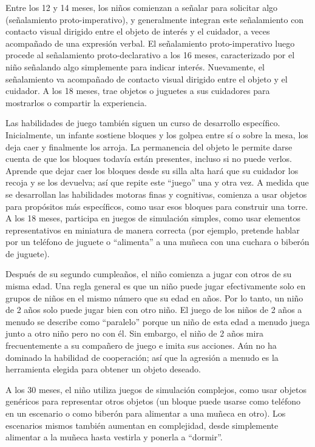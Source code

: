 \documentclass[11pt,letterpaper]{report}
\begin{document}
Entre los 12 y 14 meses, los niños comienzan a señalar para solicitar algo
(señalamiento proto-imperativo), y generalmente integran este señalamiento con
contacto visual dirigido entre el objeto de interés y el cuidador, a veces
acompañado de una expresión verbal. El señalamiento proto-imperativo luego
procede al señalamiento proto-declarativo a los 16 meses, caracterizado por el
niño señalando algo simplemente para indicar interés. Nuevamente, el
señalamiento va acompañado de contacto visual dirigido entre el objeto y el
cuidador. A los 18 meses, trae objetos o juguetes a sus cuidadores para
mostrarlos o compartir la experiencia. \cite{Gerber2011}

Las habilidades de juego también siguen un curso de desarrollo específico.
Inicialmente, un infante sostiene bloques y los golpea entre sí o sobre la
mesa, los deja caer y finalmente los arroja. La permanencia del objeto le
permite darse cuenta de que los bloques todavía están presentes, incluso si no
puede verlos. Aprende que dejar caer los bloques desde su silla alta hará que
su cuidador los recoja y se los devuelva; así que repite este ``juego'' una y
otra vez. A medida que se desarrollan las habilidades motoras finas y
cognitivas, comienza a usar objetos para propósitos más específicos, como usar
esos bloques para construir una torre. A los 18 meses, participa en juegos de
simulación simples, como usar elementos representativos en miniatura de manera
correcta (por ejemplo, pretende hablar por un teléfono de juguete o ``alimenta''
a una muñeca con una cuchara o biberón de juguete). \cite{Gerber2011}

Después de su segundo cumpleaños, el niño comienza a jugar con otros de su
misma edad. Una regla general es que un niño puede jugar efectivamente solo en
grupos de niños en el mismo número que su edad en años. Por lo tanto, un niño
de 2 años solo puede jugar bien con otro niño. El juego de los niños de 2 años
a menudo se describe como ``paralelo'' porque un niño de esta edad a menudo
juega junto a otro niño pero no con él. Sin embargo, el niño de 2 años mira
frecuentemente a su compañero de juego e imita sus acciones. Aún no ha
dominado la habilidad de cooperación; así que la agresión a menudo es la
herramienta elegida para obtener un objeto deseado. \cite{Gerber2011}

A los 30 meses, el niño utiliza juegos de simulación complejos, como usar
objetos genéricos para representar otros objetos (un bloque puede usarse como
teléfono en un escenario o como biberón para alimentar a una muñeca en otro).
Los escenarios mismos también aumentan en complejidad, desde simplemente
alimentar a la muñeca hasta vestirla y ponerla a ``dormir''. \cite{Gerber2011}
\end{document}
